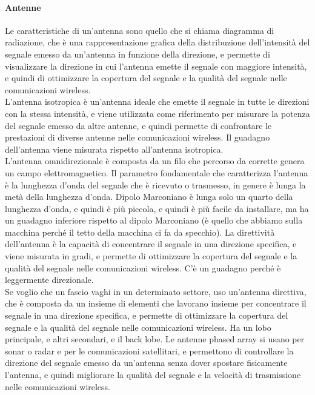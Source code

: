 \paragraph{Antenne} Le caratteristiche di un'antenna sono quello che si chiama diagramma di radiazione, che è una rappresentazione grafica della distribuzione dell'intensità del segnale emesso da un'antenna in funzione della direzione, e permette di visualizzare la direzione in cui l'antenna emette il segnale con maggiore intensità, e quindi di ottimizzare la copertura del segnale e la qualità del segnale nelle comunicazioni wireless.\\

L'antenna isotropica è un'antenna ideale che emette il segnale in tutte le direzioni con la stessa intensità, e viene utilizzata come riferimento per misurare la potenza del segnale emesso da altre antenne, e quindi permette di confrontare le prestazioni di diverse antenne nelle comunicazioni wireless. 
Il guadagno dell'antenna viene misurata rispetto all'antenna isotropica.\\

L'antenna omnidirezionale è composta da un filo che percorso da corrette genera un campo elettromagnetico. Il parametro fondamentale che caratterizza l'antenna è la lunghezza d'onda del segnale che è ricevuto o trasmesso, in genere è lunga la metà della lunghezza d'onda. Dipolo Marconiano è lunga solo un quarto della lunghezza d'onda, e quindi è più piccola, e quindi è più facile da installare, ma ha un guadagno inferiore rispetto al dipolo Marconiano (è quello che abbiamo sulla macchina perché il tetto della macchina ci fa da specchio). La direttività dell'antenna è la capacità di concentrare il segnale in una direzione specifica, e viene misurata in gradi, e permette di ottimizzare la copertura del segnale e la qualità del segnale nelle comunicazioni wireless. C'è un guadagno perché è leggermente direzionale.\\

Se voglio che un fascio vaghi in un determinato settore, uso un'antenna direttiva, che è composta da un insieme di elementi che lavorano insieme per concentrare il segnale in una direzione specifica, e permette di ottimizzare la copertura del segnale e la qualità del segnale nelle comunicazioni wireless. Ha un lobo principale, e altri secondari, e il back lobe.
Le antenne phased array si usano per sonar o radar e per le comunicazioni satellitari, e permettono di controllare la direzione del segnale emesso da un'antenna senza dover spostare fisicamente l'antenna, e quindi migliorare la qualità del segnale e la velocità di trasmissione nelle comunicazioni wireless.\\

